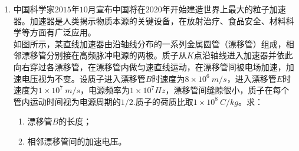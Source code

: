 \begin{enumerate}[leftmargin=0em]
\item
{}
中国科学家$ 2015 $年$ 10 $月宣布中国将在$ 2020 $年开始建造世界上最大的粒子加速器。加速器是人类揭示物质本源的关键设备，在放射治疗、食品安全、材料科学等方面有广泛应用。\\
如图所示，某直线加速器由沿轴线分布的一系列金属圆管（漂移管）组成，相邻漂移管分别接在高频脉冲电源的两极。质子从$ K $点沿轴线进入加速器并依此向右穿过各漂移管，在漂移管内做匀速直线运动，在漂移管间被电场加速，加速电压视为不变。设质子进入漂移管$ B $时速度为$ 8 \times 10^6 \ m/s $，进入漂移管$ E $时速度为$ 1 \times 10^7 \ m/s $，电源频率为$ 1 \times 10^7Hz $，漂移管间缝隙很小，质子在每个管内运动时间视为电源周期的$ 1/2 $.质子的荷质比取$ 1 \times 10^8\ C/kg $。求：
\begin{enumerate}
\renewcommand{\labelenumi}{\arabic{enumi}.}
\item
漂移管$ B $的长度；
\item 
相邻漂移管间的加速电压。


\end{enumerate}
\begin{figure}[h!]
\flushright

\end{figure}



\end{enumerate}
